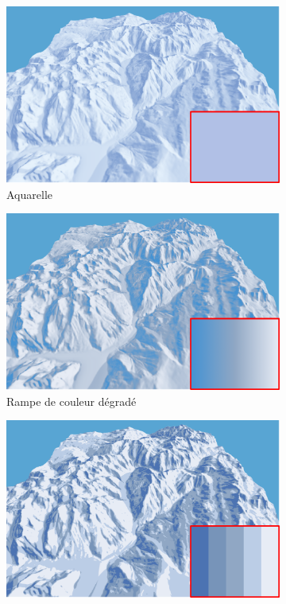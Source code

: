 \begin{figure}[h!]
\centering
 \begin{subfigure}[t]{0.32\linewidth}
 \centering
 \includegraphics[width=1.0\linewidth]{Resultats/aquarelle.png}
 \caption{Aquarelle}
 \end{subfigure}
 \begin{subfigure}[t]{0.32\linewidth}
 \centering
 \includegraphics[width=1.0\linewidth]{Resultats/colorMap.png}
  \caption{\label{fig:degradeColor}Rampe de couleur dégradé}
 \end{subfigure}
  \begin{subfigure}[t]{0.32\linewidth}
 \centering
 \includegraphics[width=1.0\linewidth]{Resultats/cel_shading.png}

\end{subfigure}
\end{figure}
